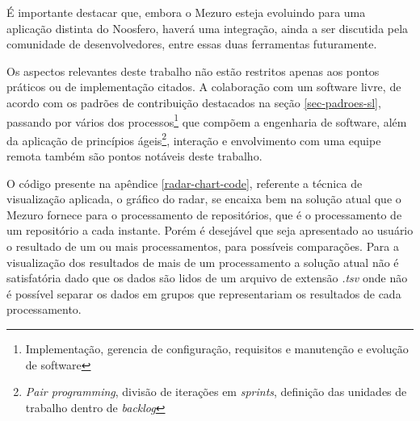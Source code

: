 É importante destacar que, embora o Mezuro esteja evoluindo para uma aplicação distinta do Noosfero, haverá uma integração, ainda a ser discutida pela comunidade de desenvolvedores, entre essas duas ferramentas futuramente.

Os aspectos relevantes deste trabalho não estão restritos apenas aos  pontos práticos ou de implementação citados. A colaboração com um software livre, de acordo com os padrões de contribuição destacados na seção \ref{sec-padroes-sl}, passando por vários dos processos\footnote{Implementação, gerencia de configuração, requisitos e manutenção e evolução de software} que compõem a engenharia de software, além da aplicação de princípios ágeis\footnote{\textit{Pair programming}, divisão de iterações em \textit{sprints}, definição das unidades de trabalho dentro de \textit{backlog}}, interação e envolvimento com uma equipe remota também são pontos notáveis deste trabalho.

O código presente na apêndice \ref{radar-chart-code}, referente a técnica de visualização aplicada, o gráfico do radar, se encaixa bem na solução atual que o Mezuro fornece para o processamento de repositórios, que é o processamento de um repositório a cada instante. Porém é desejável que seja apresentado ao usuário o resultado de um ou mais processamentos, para possíveis comparações. Para a visualização dos resultados de mais de um processamento a solução atual não é satisfatória dado que os dados são lidos de um arquivo de extensão \textit{.tsv} onde não é possível separar os dados em grupos que representariam os resultados de cada processamento.


